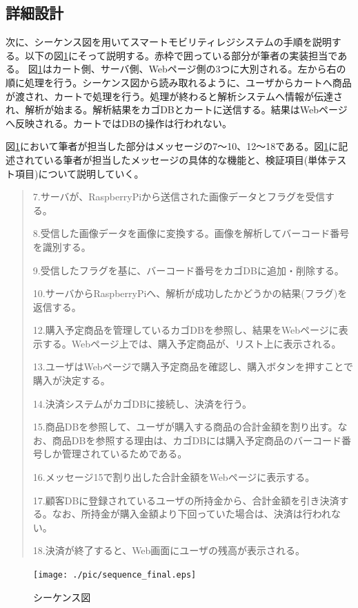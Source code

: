 \subsection*{詳細設計}
次に、シーケンス図を用いてスマートモビリティレジシステムの手順を説明する。以下の図\ref{sequence}にそって説明する。赤枠で囲っている部分が筆者の実装担当である。
図\ref{sequence}はカート側、サーバ側、Webページ側の3つに大別される。左から右の順に処理を行う。シーケンス図から読み取れるように、ユーザからカートへ商品が渡され、カートで処理を行う。処理が終わると解析システムへ情報が伝達され、解析が始まる。解析結果をカゴDBとカートに送信する。結果はWebページへ反映される。カートではDBの操作は行われない。

図\ref{sequence}において筆者が担当した部分はメッセージの7～10、12～18である。図\ref{sequence}に記述されている筆者が担当したメッセージの具体的な機能と、検証項目(単体テスト項目)について説明していく。


\begin{quote}

7.サーバが、RaspberryPiから送信された画像データとフラグを受信する。

8.受信した画像データを画像に変換する。画像を解析してバーコード番号を識別する。

9.受信したフラグを基に、バーコード番号をカゴDBに追加・削除する。

10.サーバからRaspberryPiへ、解析が成功したかどうかの結果(フラグ)を返信する。

12.購入予定商品を管理しているカゴDBを参照し、結果をWebページに表示する。Webページ上では、購入予定商品が、リスト上に表示される。

13.ユーザはWebページで購入予定商品を確認し、購入ボタンを押すことで購入が決定する。

14.決済システムがカゴDBに接続し、決済を行う。

15.商品DBを参照して、ユーザが購入する商品の合計金額を割り出す。なお、商品DBを参照する理由は、カゴDBには購入予定商品のバーコード番号しか管理されているためである。

16.メッセージ15で割り出した合計金額をWebページに表示する。

17.顧客DBに登録されているユーザの所持金から、合計金額を引き決済する。なお、所持金が購入金額より下回っていた場合は、決済は行われない。

18.決済が終了すると、Web画面にユーザの残高が表示される。
\end{quote}

\begin{figure}[htbp]
\centering
\texttt{[image: ./pic/sequence\_final.eps]}
\caption{シーケンス図}
\label{sequence}
\end{figure}


